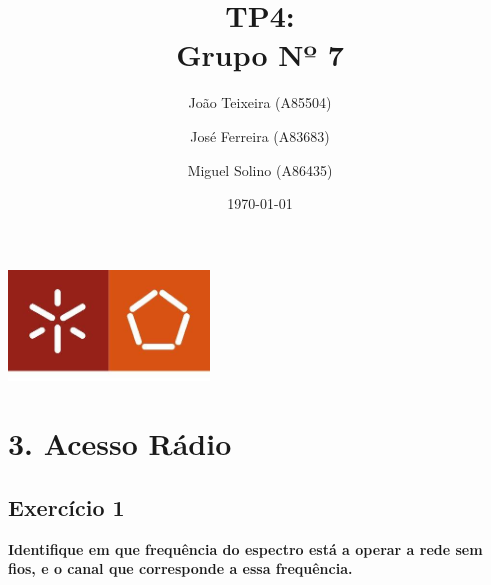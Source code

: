 \documentclass[a4paper]{report}
\begin{document}
\title{TP4:\\ 
\large Grupo Nº 7}
\author{João Teixeira (A85504) \and José Ferreira (A83683) \and Miguel Solino (A86435)}

\date{\today}

\begin{center}
    \begin{minipage}{0.75\linewidth}
        \centering
        \includegraphics[width=0.4\textwidth]{images/eng.jpeg}\par\vspace{1cm}
        \vspace{1cm}
        \href{https://www.uminho.pt/PT}
        {\color{black}{\scshape\LARGE Universidade do Minho}} \par
        \vspace{1cm}
        \href{https://www.di.uminho.pt/}
        {\color{black}{\scshape\Large Departamento de Informática}} \par
        \maketitle
    \end{minipage}
\end{center}

\tableofcontents

\chapter{3. Acesso Rádio}
\section{Exercício 1}
\textbf{Identifique em que frequência do espectro está a operar a rede sem fios,
e o canal que corresponde a essa frequência.}
\end{document}
